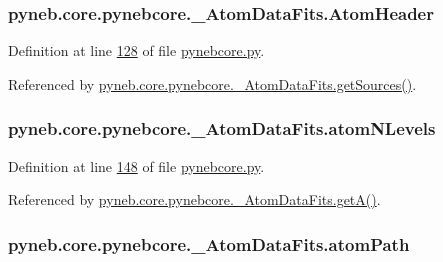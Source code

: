 \subsubsection[{Atom\+Header}]{\setlength{\rightskip}{0pt plus 5cm}pyneb.\+core.\+pynebcore.\+\_\+\+Atom\+Data\+Fits.\+Atom\+Header}\label{classpyneb_1_1core_1_1pynebcore_1_1___atom_data_fits_a660b5b881aa31dd7dcb6fecfe0735f70}


Definition at line \hyperlink{pynebcore_8py_source_l00128}{128} of file \hyperlink{pynebcore_8py_source}{pynebcore.\+py}.



Referenced by \hyperlink{pynebcore_8py_source_l00183}{pyneb.\+core.\+pynebcore.\+\_\+\+Atom\+Data\+Fits.\+get\+Sources()}.

\hypertarget{classpyneb_1_1core_1_1pynebcore_1_1___atom_data_fits_a4ff73bfa251e1139692c2a60f9821315}{}
\subsubsection[{atom\+N\+Levels}]{\setlength{\rightskip}{0pt plus 5cm}pyneb.\+core.\+pynebcore.\+\_\+\+Atom\+Data\+Fits.\+atom\+N\+Levels}\label{classpyneb_1_1core_1_1pynebcore_1_1___atom_data_fits_a4ff73bfa251e1139692c2a60f9821315}


Definition at line \hyperlink{pynebcore_8py_source_l00148}{148} of file \hyperlink{pynebcore_8py_source}{pynebcore.\+py}.



Referenced by \hyperlink{pynebcore_8py_source_l00205}{pyneb.\+core.\+pynebcore.\+\_\+\+Atom\+Data\+Fits.\+get\+A()}.

\hypertarget{classpyneb_1_1core_1_1pynebcore_1_1___atom_data_fits_a2a9232b1a5ad60259d33d934e2cf5bf3}{}
\subsubsection[{atom\+Path}]{\setlength{\rightskip}{0pt plus 5cm}pyneb.\+core.\+pynebcore.\+\_\+\+Atom\+Data\+Fits.\+atom\+Path}\label{classpyneb_1_1core_1_1pynebcore_1_1___atom_data_fits_a2a9232b1a5ad60259d33d934e2cf5bf3}


